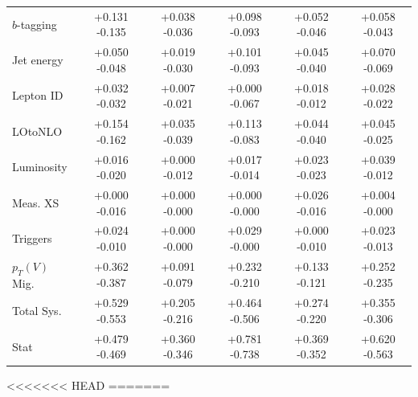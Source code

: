 \begin{table}
\begin{tabular}{|l|c|c|c|c|c|}
\hline
$b$-tagging & {+0.131} {-0.135} & {+0.038} {-0.036} & {+0.098} {-0.093} & {+0.052} {-0.046} & {+0.058} {-0.043}\\
Jet energy & {+0.050} {-0.048} & {+0.019} {-0.030} & {+0.101} {-0.093} & {+0.045} {-0.040} & {+0.070} {-0.069}\\
Lepton ID & {+0.032} {-0.032} & {+0.007} {-0.021} & {+0.000} {-0.067} & {+0.018} {-0.012} & {+0.028} {-0.022}\\
LOtoNLO & {+0.154} {-0.162} & {+0.035} {-0.039} & {+0.113} {-0.083} & {+0.044} {-0.040} & {+0.045} {-0.025}\\
Luminosity & {+0.016} {-0.020} & {+0.000} {-0.012} & {+0.017} {-0.014} & {+0.023} {-0.023} & {+0.039} {-0.012}\\
Meas. XS & {+0.000} {-0.016} & {+0.000} {-0.000} & {+0.000} {-0.000} & {+0.026} {-0.016} & {+0.004} {-0.000}\\
Triggers & {+0.024} {-0.010} & {+0.000} {-0.000} & {+0.029} {-0.000} & {+0.000} {-0.010} & {+0.023} {-0.013}\\
$p_T(V)$ Mig. & {+0.362} {-0.387} & {+0.091} {-0.079} & {+0.232} {-0.210} & {+0.133} {-0.121} & {+0.252} {-0.235}\\
\hline
Total Sys. & {+0.529} {-0.553} & {+0.205} {-0.216} & {+0.464} {-0.506} & {+0.274} {-0.220} & {+0.355} {-0.306}\\
Stat & {+0.479} {-0.469} & {+0.360} {-0.346} & {+0.781} {-0.738} & {+0.369} {-0.352} & {+0.620} {-0.563}\\
\hline
  \end{tabular}
\end{table}


<<<<<<< HEAD
=======

